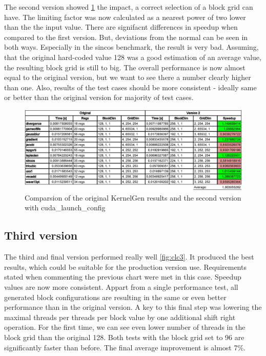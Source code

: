 \documentclass{usiinftr}
\begin{document}
The second version showed \ref{fig:clc2} the impact, a correct selection of a block grid can have. The limiting factor was now calculated as a nearest power of two lower than the the input value. There are signifacnt differences in speedup when compared to the first version. But, deviations from the normal can be seen in both ways. Especially in the sincos benchmark, the result is very bad. Assuming, that the original hard-coded value 128 was a good estimation of an average value, the resulting block grid is still to big. The overall performance is now almost equal to the original version, but we want to see there a number clearly higher than one. Also, results of the test cases should be more consistent - ideally same or better than the original version for majority of test cases.

\begin{figure}[H]
\begin{center}
  \includegraphics[width=1\textwidth]{figures/kernelgen_v2}
  \caption{Comparsion of the original KernelGen results and the second version with cuda\_launch\_config \label{fig:clc2}}  
\end{center}
\end{figure}

\subsection{Third version}

The third and final version performed really well \ref{fig:clc3}. It produced the best results, which could be suitable for the production version use. Requirements stated when commenting the previous chart were met in this case. Speedup values are now more consistent. Appart from a single performance test, all generated block configurations are resulting in the same or even better performance than in the original version. A key to this final step was lowering the maximal threads per threads per block value by one additional shift right operation. For the first time, we can see even lower number of threads in the block grid than the original 128. Both tests with the block grid set to 96 are significantly faster than before. The final average improvement is almost 7\%.
\end{document}
